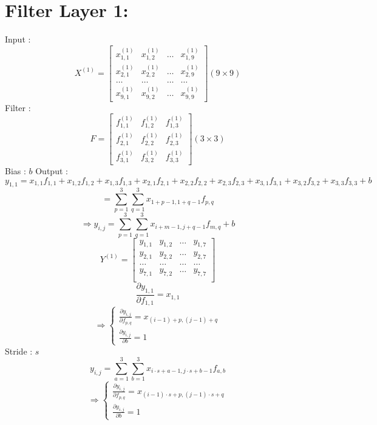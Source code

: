\documentclass{article}
\begin{document}
    \section*{Filter Layer 1:}
    Input : 
    \[
        X^{(1)} = \begin{bmatrix}
            x_{1, 1}^{(1)} & x_{1, 2}^{(1)} & \hdots & x_{1, 9}^{(1)} \\
            x_{2, 1}^{(1)} & x_{2, 2}^{(1)} & \hdots & x_{2, 9}^{(1)} \\
            \hdots & \hdots & \hdots & \hdots \\
            x_{9, 1}^{(1)} & x_{9, 2}^{(1)} & \hdots & x_{9, 9}^{(1)}
        \end{bmatrix} (9 \times 9)
    \]
    Filter : 
    \[
        F = \begin{bmatrix}
            f_{1, 1}^{(1)} & f_{1, 2}^{(1)} & f_{1, 3}^{(1)} \\
            f_{2, 1}^{(1)} & f_{2, 2}^{(1)} & f_{2, 3}^{(1)} \\
            f_{3, 1}^{(1)} & f_{3, 2}^{(1)} & f_{3, 3}^{(1)}
        \end{bmatrix} (3 \times 3)
    \]
    Bias : $b$
    Output : 
    \[
        y_{1, 1} = x_{1, 1}f_{1, 1} + x_{1, 2}f_{1, 2} + x_{1, 3}f_{1, 3} + 
                   x_{2, 1}f_{2, 1} + x_{2, 2}f_{2, 2} + x_{2, 3}f_{2, 3} + 
                   x_{3, 1}f_{3, 1} + x_{3, 2}f_{3, 2} + x_{3, 3}f_{3, 3} + b
    \]
    \[
        = \sum_{p = 1}^{3}\sum_{q=1}^{3}x_{1 + p - 1, 1 + q - 1}f_{p, q}
    \]
    \[
        \Rightarrow y_{i, j} = 
        \sum_{p=1}^{3}\sum_{q=1}^{3}x_{i + m - 1, j + q - 1}f_{m, q} + b
    \]
    \[
        Y^{(1)} = \begin{bmatrix}
            y_{1, 1} & y_{1, 2} & \hdots & y_{1, 7} \\
            y_{2, 1} & y_{2, 2} & \hdots & y_{2, 7} \\
            \hdots & \hdots & \hdots & \hdots \\
            y_{7, 1} & y_{7, 2} & \hdots & y_{7, 7} \\
        \end{bmatrix}
    \]
    \[
        \frac{\partial y_{1, 1}}{\partial f_{1, 1}} = x_{1, 1}
    \]
    \[
        \Rightarrow \begin{cases}
            \frac{\partial y_{i, j}}{\partial f_{p, q}} = 
            x_{(i - 1) + p, (j - 1) + q} \\
            \frac{\partial y_{i, j}}{\partial b} = 1
        \end{cases}
    \]
    Stride : $s$
    \[
        y_{i, j} = \sum_{a=1}^{3}\sum_{b=1}^{3}x_{i \cdot s + a - 1, j \cdot s + b - 1}f_{a, b}
    \]
    \[
        \Rightarrow \begin{cases}
            \frac{\partial y_{i, j}}{\partial f_{p, q}} = 
            x_{(i-1) \cdot s + p, (j-1) \cdot s + q} \\
            \frac{\partial y_{i, j}}{\partial b} = 1
        \end{cases}
    \]
\end{document}
